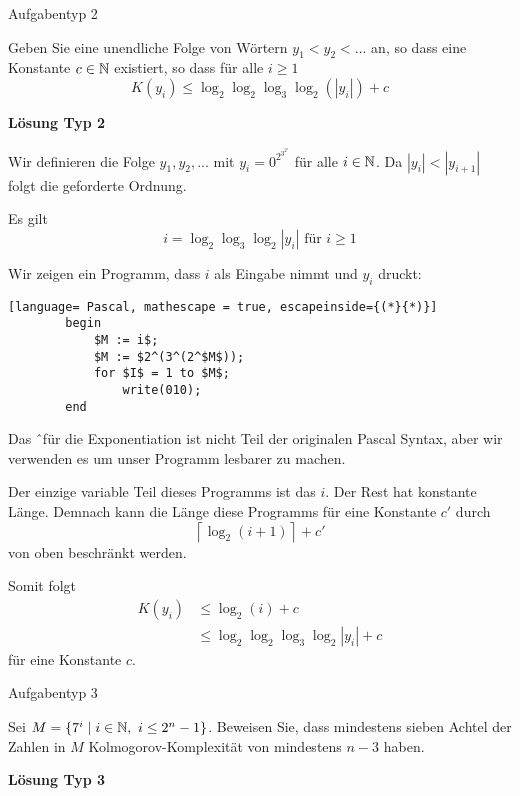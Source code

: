 \vspace*{1cm}

    \begin{subbox}{Aufgabentyp 2}

    Geben Sie eine unendliche Folge von Wörtern $y_1 < y_2 < ...$ an, so dass eine Konstante $c \in \mathbb{N}$ existiert, so dass für alle $i \geq 1$ 
    $$K(y_i) \leq \log_2\log_2\log_3\log_2(|y_i|) + c$$
    \end{subbox}

    \textbf{Lösung Typ 2}
    
    Wir definieren die Folge $y_1,y_2,...$ mit $y_i = 0^{2^{3^{2^i}}}$ für alle $i \in \mathbb{N}$. Da $|y_i| < |y_{i+1}|$ folgt die geforderte Ordnung.

    Es gilt
    $$i = \log_2\log_3\log_2|y_i|  \text{ für } i \geq 1$$

    Wir zeigen ein Programm, dass $i$ als Eingabe nimmt und $y_i$ druckt:

    \begin{lstlisting}[language= Pascal, mathescape = true, escapeinside={(*}{*)}]
        begin
            $M := i$;
            $M := $2^(3^(2^$M$));
            for $I$ = 1 to $M$;
                write(010);
        end
    \end{lstlisting}
    Das \^ \ für die Exponentiation ist nicht Teil der originalen Pascal Syntax, aber wir verwenden es um unser Programm lesbarer zu machen.

    Der einzige variable Teil dieses Programms ist das $i$. Der Rest hat konstante Länge. Demnach kann die Länge diese Programms für eine Konstante $c'$ durch 
    $$\left\lceil\log_2(i+1)\right\rceil + c'$$
    von oben beschränkt werden.

    Somit folgt
    \begin{align*}
        K(y_i) &\leq \log_2(i) + c\\
        &\leq \log_2\log_2\log_3\log_2|y_i| + c
    \end{align*}
    für eine Konstante $c$. 

\vspace*{1cm}

    \begin{subbox}{Aufgabentyp 3}

    Sei $M = \{7^i \mid i \in \mathbb{N}, \ i \leq 2^n-1\}$. Beweisen Sie, dass mindestens sieben Achtel der Zahlen in $M$ Kolmogorov-Komplexität von mindestens $n-3$ haben.

    \end{subbox}
    \textbf{Lösung Typ 3}

